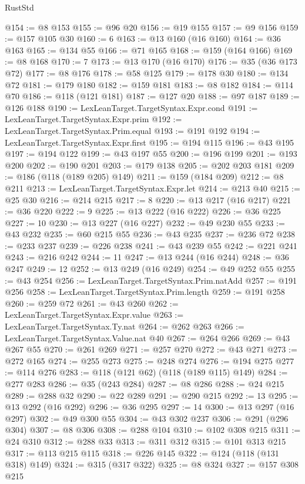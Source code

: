\begin{lexlean}{RustStd}
\begin{coremodule}
@154 := @8 @153
@155 := @96 @20
@156 := @19 @155
@157 := @9 @156
@159 := @157 @105 @30
@160 := 6
@163 := @13 @160 (@16 @160)
@164 := @36 @163
@165 := @134 @55
@166 := @71 @165
@168 := @159 (@164 @166)
@169 := @8 @168
@170 := 7
@173 := @13 @170 (@16 @170)
@176 := @35 (@36 @173 @72)
@177 := @8 @176
@178 := @58 @125
@179 := @178 @30
@180 := @134 @72
@181 := @179 @180
@182 := @159 @181
@183 := @8 @182
@184 := @114 @70
@186 := @118 (@121 @181)
@187 := @127 @20
@188 := @97 @187
@189 := @126 @188
@190 := LexLeanTarget.TargetSyntax.Expr.cond
@191 := LexLeanTarget.TargetSyntax.Expr.prim
@192 := LexLeanTarget.TargetSyntax.Prim.equal
@193 := @191 @192
@194 := LexLeanTarget.TargetSyntax.Expr.first
@195 := @194 @115
@196 := @43 @195
@197 := @194 @122
@199 := @43 @197 @55
@200 := @196 @199
@201 := @193 @200
@202 := @190 @201
@203 := @179 @138
@205 := @202 @203 @181
@209 := @186 (@118 (@189 @205) @149)
@211 := @159 (@184 @209)
@212 := @8 @211
@213 := LexLeanTarget.TargetSyntax.Expr.let
@214 := @213 @40
@215 := @25 @30
@216 := @214 @215
@217 := 8
@220 := @13 @217 (@16 @217)
@221 := @36 @220
@222 := 9
@225 := @13 @222 (@16 @222)
@226 := @36 @225
@227 := 10
@230 := @13 @227 (@16 @227)
@232 := @49 @230 @55
@233 := @43 @232
@235 := @60 @215 @55
@236 := @43 @235
@237 := @236 @72
@238 := @233 @237
@239 := @226 @238
@241 := @43 @239 @55
@242 := @221 @241
@243 := @216 @242
@244 := 11
@247 := @13 @244 (@16 @244)
@248 := @36 @247
@249 := 12
@252 := @13 @249 (@16 @249)
@254 := @49 @252 @55
@255 := @43 @254
@256 := LexLeanTarget.TargetSyntax.Prim.natAdd
@257 := @191 @256
@258 := LexLeanTarget.TargetSyntax.Prim.length
@259 := @191 @258
@260 := @259 @72
@261 := @43 @260
@262 := LexLeanTarget.TargetSyntax.Expr.value
@263 := LexLeanTarget.TargetSyntax.Ty.nat
@264 := @262 @263
@266 := LexLeanTarget.TargetSyntax.Value.nat @40
@267 := @264 @266
@269 := @43 @267 @55
@270 := @261 @269
@271 := @257 @270
@272 := @43 @271
@273 := @272 @165
@274 := @255 @273
@275 := @248 @274
@276 := @194 @275
@277 := @114 @276
@283 := @118 (@121 @62) (@118 (@189 @115) @149)
@284 := @277 @283
@286 := @35 (@243 @284)
@287 := @8 @286
@288 := @24 @215
@289 := @288 @32
@290 := @22 @289
@291 := @290 @215
@292 := 13
@295 := @13 @292 (@16 @292)
@296 := @36 @295
@297 := 14
@300 := @13 @297 (@16 @297)
@302 := @49 @300 @55
@304 := @43 @302 @237
@306 := @291 (@296 @304)
@307 := @8 @306
@308 := @288 @104
@310 := @102 @308 @215
@311 := @24 @310
@312 := @288 @33
@313 := @311 @312
@315 := @101 @313 @215
@317 := @113 @215 @115
@318 := @226 @145
@322 := @124 (@118 (@131 @318) @149)
@324 := @315 (@317 @322)
@325 := @8 @324
@327 := @157 @308 @215

\end{coremodule}
\end{lexlean}
